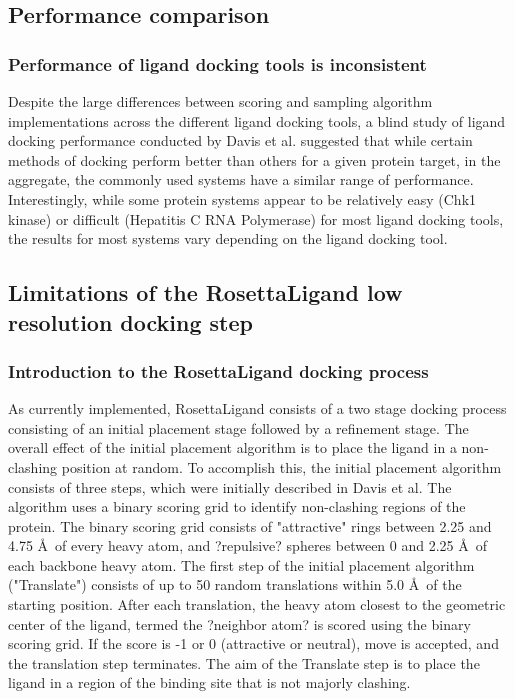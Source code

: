 \subsection{Performance comparison}

\subsubsection{Performance of ligand docking tools is inconsistent} 
Despite the large differences between scoring and sampling algorithm implementations across the different ligand docking tools, a blind study of ligand docking performance conducted by Davis et al.\citep{Davis:2009fx} suggested that while certain methods of docking perform better than others for a given protein target, in the aggregate, the commonly used systems have a similar range of performance.
Interestingly, while some protein systems appear to be relatively easy (Chk1 kinase) or difficult (Hepatitis C RNA Polymerase) for most ligand docking tools, the results for most systems vary depending on the ligand docking tool.

\subsection{Limitations of the RosettaLigand low resolution docking step}

\subsubsection{Introduction to the RosettaLigand docking process}
As currently implemented, RosettaLigand consists of a two stage docking process consisting of an initial placement stage followed by a refinement stage.
The overall effect of the initial placement algorithm is to place the ligand in a non-clashing position at random.
To accomplish this, the initial placement algorithm consists of three steps, which were initially described in Davis et al.\citep{Davis:2009bf}
The algorithm uses a binary scoring grid to identify non-clashing regions of the protein.
The binary scoring grid consists of "attractive" rings between 2.25 and 4.75 \AA\ of every heavy atom, and ?repulsive? spheres between 0 and 2.25 \AA\ of each backbone heavy atom. 
The first step of the initial placement algorithm ("Translate") consists of up to 50 random translations within 5.0 \AA\ of the starting position.
After each translation, the heavy atom closest to the geometric center of the ligand, termed the ?neighbor atom? is scored using the binary scoring grid.
If the score is -1 or 0 (attractive or neutral), move is accepted, and the translation step terminates.
The aim of the Translate step is to place the ligand in a region of the binding site that is not majorly clashing.

